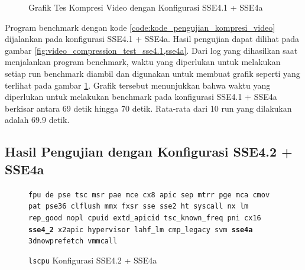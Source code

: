 \begin{figure}
    \centering
    \caption{Grafik Tes Kompresi Video dengan Konfigurasi SSE4.1 + SSE4a}
    \label{fig:video_compression_test_sse4.1,sse4a_graph}
\end{figure}

Program benchmark dengan kode \ref{code:kode_pengujian_kompresi_video} dijalankan pada konfigurasi SSE4.1 + SSE4a. Hasil pengujian dapat dilihat pada gambar \ref{fig:video_compression_test_sse4.1,sse4a}. Dari log yang dihasilkan saat menjalankan program benchmark, waktu yang diperlukan untuk melakukan setiap run benchmark diambil dan digunakan untuk membuat grafik seperti yang terlihat pada gambar \ref{fig:video_compression_test_sse4.1,sse4a_graph}. Grafik tersebut menunjukkan bahwa waktu yang diperlukan untuk melakukan benchmark pada konfigurasi SSE4.1 + SSE4a berkisar antara 69 detik hingga 70 detik. Rata-rata dari 10 run yang dilakukan adalah 69.9 detik.

\subsection{Hasil Pengujian dengan Konfigurasi SSE4.2 + SSE4a}
\begin{figure}
    \texttt{fpu de pse tsc msr pae mce cx8 apic sep mtrr pge mca cmov pat pse36 clflush mmx fxsr sse sse2 ht syscall nx lm rep\_good nopl cpuid extd\_apicid tsc\_known\_freq pni cx16 \textbf{sse4\_2} x2apic hypervisor lahf\_lm cmp\_legacy svm \textbf{sse4a} 3dnowprefetch vmmcall}
    \caption{\texttt{lscpu} Konfigurasi SSE4.2 + SSE4a}
    \label{fig:lscpu_video_compression_test_sse4.2,sse4a}
\end{figure}

